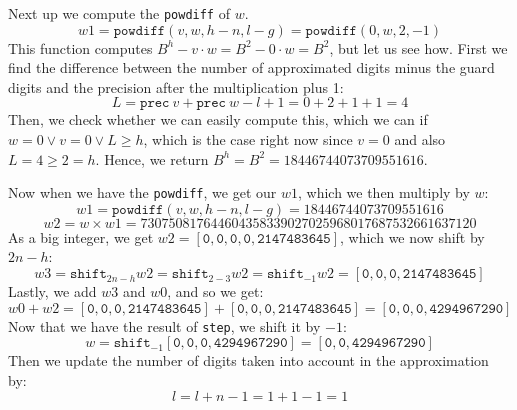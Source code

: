 Next up we compute the \texttt{powdiff} of $w$.
\[w1 = \mathtt{powdiff}(v,w,h-n,l-g) = \mathtt{powdiff}(0,w,2,-1)\]
This function computes $B^{h}-v\cdot w = B^{2}-0\cdot w = B^2$, but let us see how. First we find the difference between the number of approximated digits minus the guard digits and the precision after the multiplication plus 1:
\[ L = \mathtt{prec}~v + \mathtt{prec}~w - l + 1 = 0 + 2 + 1 + 1 = 4\]
Then, we check whether we can easily compute this, which we can if $w = 0 \lor v = 0 \lor L \geq h$, which is the case right now since $v = 0$ and also $L = 4 \geq 2 = h$. Hence, we return $B^{h}=B^{2}=18446744073709551616$.

Now when we have the \texttt{powdiff}, we get our $w1$, which we then multiply by $w$:
\[w1 = \mathtt{powdiff}(v,w,h-n,l-g) = 18446744073709551616\]
\[w2 = w \times w1 = 730750817644604358339027025968017687532661637120\]
As a big integer, we get $w2 = \mathtt{[0,0,0,0,2147483645]}$, which we now shift by $2n - h$:
\[w3 = \mathtt{shift}_{2n - h}w2 = \mathtt{shift}_{2 - 3}w2 = \mathtt{shift}_{-1}w2 = \mathtt{[0,0,0,2147483645]}\]
Lastly, we add $w3$ and $w0$, and so we get:
\[ w0 + w2 =  \mathtt{[0,0,0,2147483645]} + \mathtt{[0,0,0,2147483645]} = \mathtt{[0,0,0,4294967290]}\]
Now that we have the result of \texttt{step}, we shift it by $-1$:
\[w = \mathtt{shift}_{-1} \mathtt{[0,0,0,4294967290]} = \mathtt{[0,0,4294967290]}\]
Then we update the number of digits taken into account in the approximation by:
\[l = l + n - 1 = 1 + 1 - 1 = 1\]


